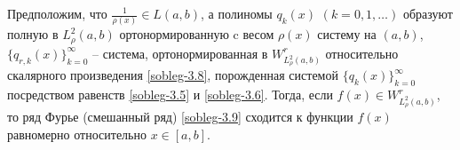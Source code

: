 \begin{state}\label{soblegstate2}
Предположим, что  $ \frac{1}{\rho(x)}\in L(a,b) $, а  полиномы $q_k(x)$ $(k=0,1,\ldots)$  образуют полную в $L^2_\rho(a,b)$ ортонормированную   c весом   $\rho(x)$ систему на $(a,b)$, $\{q_{r,k}(x)\}_{k=0}^\infty$ -- система, ортонормированная в $W^r_{L^2_\rho(a,b)}$ относительно скалярного произведения \eqref{sobleg-3.8}, порожденная системой $\{q_{k}(x)\}_{k=0}^\infty$ посредством равенств \eqref{sobleg-3.5} и \eqref{sobleg-3.6}.
Тогда, если $f(x)\in W^r_{L^2_\rho(a,b)}$, то ряд Фурье (смешанный ряд) \eqref{sobleg-3.9} сходится к функции $f(x)$ равномерно относительно $x\in[a,b]$.
\end{state}



